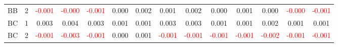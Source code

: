 \begin{table}[!htb]
{\begin{tabular}{llcccccccccccc}
BB & 2 & \textcolor{red}{-0.001} & \textcolor{red}{-0.000} & \textcolor{red}{-0.001} & 0.000 & 0.002 & 0.001 & 0.002 & 0.000 & 0.001 & 0.000 & \textcolor{red}{-0.000} & \textcolor{red}{-0.001}\\
BC & 1 & 0.003 & 0.004 & 0.003 & 0.001 & 0.001 & 0.003 & 0.003 & 0.001 & 0.001 & 0.002 & 0.001 & 0.001\\
BC & 2 & \textcolor{red}{-0.001} & \textcolor{red}{-0.003} & \textcolor{red}{-0.001} & 0.000 & 0.001 & \textcolor{red}{-0.001} & \textcolor{red}{-0.001} & \textcolor{red}{-0.001} & \textcolor{red}{-0.001} & \textcolor{red}{-0.002} & \textcolor{red}{-0.001} & \textcolor{red}{-0.001}\\
\hline
    \end{tabular}%
    }
\end{table}

